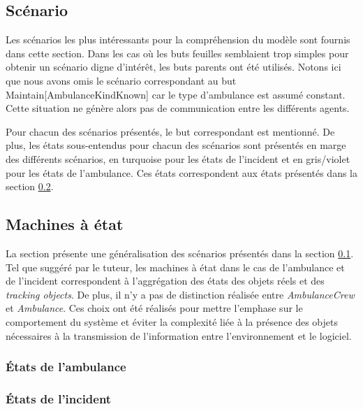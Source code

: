 \subsection{Scénario}
\label{sec:scenario}

	Les scénarios les plus intéressants pour la compréhension du modèle sont
	fournis dans cette section.  Dans les cas où les buts feuilles semblaient
	trop simples pour obtenir un scénario digne d'intérêt, les buts parents ont
	été utilisés.  Notons ici que nous avons omis le scénario correspondant au
	but Maintain[AmbulanceKindKnown] car le type d'ambulance est assumé
	constant.  Cette situation ne génère alors pas de communication entre les
	différents agents. 

	Pour chacun des scénarios présentés, le but correspondant est mentionné.
	De plus, les états sous-entendus pour chacun des scénarios sont présentés
	en marge des différents scénarios, en turquoise pour les états de
	l'incident et en gris/violet pour les états de l'ambulance.  Ces états
	correspondent aux états présentés dans la section \ref{sec:MachineAEtat}.

	
	
	
	
	

\subsection{Machines à état}
\label{sec:MachineAEtat}

	La section présente une généralisation des scénarios présentés dans la
	section \ref{sec:scenario}.   Tel que suggéré par le tuteur,  les machines
	à état dans le cas de l'ambulance et de l'incident correspondent à
	l'aggrégation des états des objets réels et des \textit{tracking objects}.
	De plus, il n'y a pas de distinction réalisée entre \textit{AmbulanceCrew}
	et \textit{Ambulance}.  Ces choix ont été réalisés pour mettre l'emphase
	sur le comportement du système et éviter la complexité liée à la présence
	des objets nécessaires à la transmission de l'information entre
	l'environnement et le logiciel.
 	
\subsubsection{États de l'ambulance}

\subsubsection{États de l'incident}
